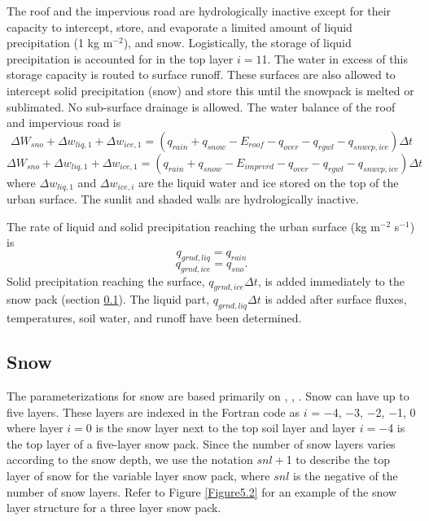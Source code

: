 \documentclass[12pt,authoryear]{elsarticle}
\numberwithin{equation}{section} %
\begin{document}
The roof and the impervious road are hydrologically inactive except for their capacity to intercept, store, and evaporate a limited amount of liquid precipitation (1 kg m$^{-2}$), and snow. Logistically, the storage of liquid precipitation is accounted for in the top layer $i=1$1. The water in excess of this storage capacity is routed to surface runoff. These surfaces are also allowed to intercept solid precipitation (snow) and store this until the snowpack is melted or sublimated. No sub-surface drainage is allowed. The water balance of the roof and impervious road is 
\begin{equation}
\Delta W_{sno} + \Delta w_{liq,1} + \Delta w_{ice,1} = (q_{rain}+q_{snow}-E_{roof}-q_{over}-q_{rgwl}-q_{snwcp,ice}) \Delta t
\end{equation}
\begin{equation}
\Delta W_{sno} + \Delta w_{liq,1} + \Delta w_{ice,1} = (q_{rain}+q_{snow}-E_{imprvrd}-q_{over}-q_{rgwl}-q_{snwcp,ice}) \Delta t
\end{equation}
where $\Delta w_{liq,1}$ and $\Delta w_{ice,i}$ are the liquid water and ice stored on the top of the urban surface. The sunlit and shaded walls are hydrologically inactive.

The rate of liquid and solid precipitation reaching the urban surface (kg m$^{-2}$ s$^{-1}$) is 
\begin{equation}
q_{grnd,liq}=q_{rain}
\end{equation}
\begin{equation}
q_{grnd,ice}=q_{sno}.
\end{equation}
Solid precipitation reaching the surface, $q_{grnd,ice} \Delta t$, is added immediately to the snow pack (section \ref{sec:snow}). The liquid part, $q_{grnd,liq} \Delta t$ is added after surface fluxes, temperatures, soil water, and runoff have been determined.

\subsection{Snow}
\label{sec:snow}
%
The parameterizations for snow are based primarily on \cite{andersonPointEnergyMass1976}, \cite{jordanOnedimensionalTemperatureModel1991}, \cite{yongjiuLandSurfaceModel1997}. Snow can have up to five layers. These layers are indexed in the Fortran code as $i$ = $-$4, $-$3, $-$2, $-$1, 0 where layer $i=0$ is the snow layer next to the top soil layer and layer $i=-$4 is the top layer of a five-layer snow pack. Since the number of snow layers varies according to the snow depth, we use the notation
$snl+$1 to describe the top layer of snow for the variable layer snow pack, where $snl$ is the negative of the number of snow layers. Refer to Figure \ref{Figure5.2} for an example of the snow layer structure for a three layer snow pack.
\end{document}
